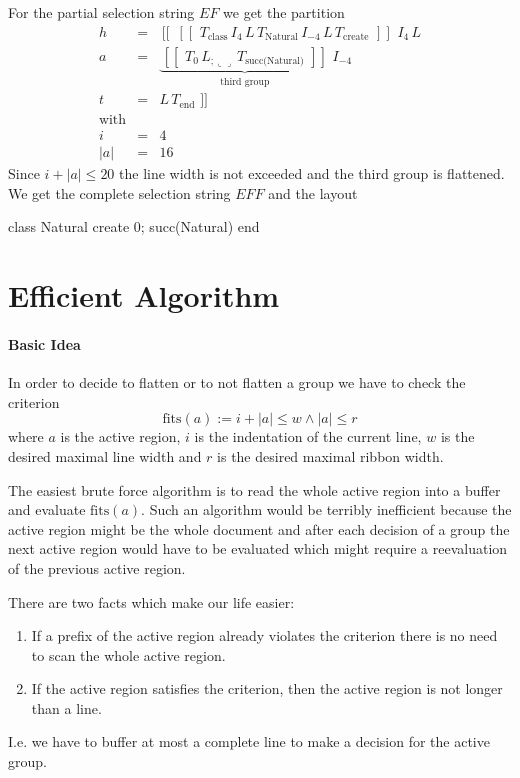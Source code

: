 \documentclass[12pt]{article}
\def\blank{\llcorner\!\!\lrcorner}
\def\class{\text{class}}
\def\create{\text{create}}
\def\fits{\text{fits}}
\def\kwend{\text{end}}
\def\GS{\,[\![\,}
\def\GE{\,]\!]\,}
\def\Natural{\text{Natural}}
\begin{document}
For the partial selection string $EF$ we get the partition
$$
\begin{array}{lll}
  h &=& \GS \,
        \GS \, T_\class\,
        I_4\, L\, T_\Natural\, I_{-4}\, L \, T_\create\, \GE \, I_4\, L
  \\
  a &=& \underbrace{
        \GS \,T_0\, L_{;\blank}\, T_\text{succ(Natural)}\, \GE
        }_{\text{third group}}
        \, I_{-4}
  \\
  t & = & L \, T_\kwend \, \GE
  \\
  \text{with}
  \\
  i & = & 4
  \\
  |a| & = & 16%
\end{array}
$$%
Since $i + |a| \le 20$ the line width is not exceeded and the third group is
flattened. We get the complete selection string $E F F$ and the layout
\begin{alba}
    class Natural create
        0; succ(Natural)
    end
\end{alba}



\section{Efficient Algorithm}


\paragraph{Basic Idea}
In order to decide to flatten or to not flatten a group we have to check the
criterion
$$
\fits(a) := i + |a| \le w \land |a| \le r
$$%
where $a$ is the active region, $i$ is the indentation of the current line,
$w$ is the desired maximal line width and $r$ is the desired maximal ribbon
width.

The easiest brute force algorithm is to read the whole active region into a
buffer and evaluate $\fits(a)$. Such an algorithm would be terribly
inefficient because the active region might be the whole document and after
each decision of a group the next active region would have to be evaluated
which might require a reevaluation of the previous active region.

There are two facts which make our life easier:
\begin{enumerate}
\item If a prefix of the active region already violates the criterion there is
  no need to scan the whole active region.

\item If the active region satisfies the criterion, then the active region is
  not longer than a line.
\end{enumerate}
%
I.e. we have to buffer at most a complete line to make a decision for the
active group.
\end{document}
